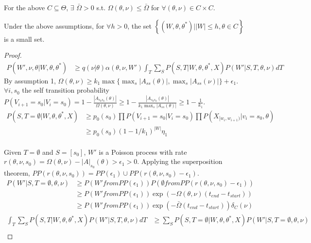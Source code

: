 \begin{assumption}
For the above $C \subseteq \Theta$, $\exists$ $\bar{\Omega} > 0$ s.t. $\Omega(\theta, \nu)  \leq \bar{\Omega}$ for $\forall (\theta, \nu) \in C \times C$.
\end{assumption}


\begin{theorem}
Under the above assumptions, for $\forall h > 0$, the set $\left\lbrace (W, \theta, \theta^*) | |W| \leq h, \theta \in C \right\rbrace$ is a small set.
\end{theorem}
\begin{proof}
\begin{align*}
P(W', \nu, \theta | W, \theta, \theta^*) &\geq q(\nu | \theta)\alpha(\theta, \nu, W') \int_T \sum_S P(S,T | W, \theta, \theta^*, X) P(W'| S, T, \theta, \nu)dT  
\end{align*}
By assumption 1,  $\Omega(\theta, \nu) \geq k_1 \max\{ \max_s|A_{ss}(\theta)|, \max_s|A_{ss}(\nu)|\} + \epsilon_1 $. $\forall i, s_0$ the self transition probability $P(V_{i + 1} = s_0 | V_i = s_0) = 1 - \frac{|A_{s_0s_0}(\theta)|}{\Omega(\theta, \nu)} \geq 1 - \frac{|A_{s_0s_0}(\theta)|}{k_1 \max_s|A_{ss}(\theta)|} \geq 1 - \frac{1}{k_1}$.
\begin{align*}
P(S, T = \emptyset | W, \theta, \theta^*, X) & \geq p_0(s_0)\prod P(V_{i + 1} = s_0 | V_i = s_0) \prod P(X_{[w_i, w_{i + 1})} | v_i = s_0, \theta)\\
& \geq p_0(s_0)(1 - 1/k_1)^{|W|}\eta_1
\end{align*}
\\
Given $T = \emptyset$ and $S = [s_0]$, $W'$ is a Poisson process with rate 
$r(\theta, \nu, s_0) = \Omega(\theta, \nu) - |A|_{s_0}(\theta) > \epsilon_1 > 0$. 
Applying the superposition theorem, $PP(r(\theta, \nu, s_0)) = PP(\epsilon_1) \cup PP(r(\theta, \nu, s_0) - \epsilon_1)$.
\begin{align*}
P(W' | S, T = \emptyset, \theta, \nu) & \geq P(W' from PP(\epsilon_1)) P(\emptyset from PP(r(\theta, \nu, s_0) - \epsilon_1))\\
& \geq P(W' from PP(\epsilon_1)) \exp(-\Omega(\theta, \nu)(t_{end} - t_{start}))\\
& \geq P(W' from PP(\epsilon_1)) \exp(-\bar{\Omega}(t_{end} - t_{start}))\delta_C(\nu)
\end{align*}
\begin{align*}
\int_T \sum_S P(S,T | W, \theta, \theta^*, X) P(W'| S, T, \theta, \nu)dT &\geq \sum_S P(S, T = \emptyset | W, \theta, \theta^*, X) P(W' | S, T=\emptyset,\theta, \nu)\\

\end{align*}
\end{proof}
